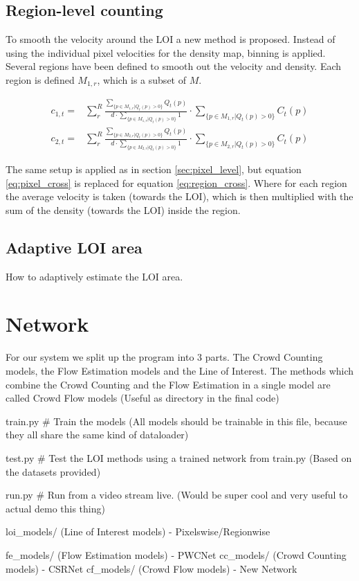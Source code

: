 \subsection{Region-level counting}
To smooth the velocity around the LOI a new method is proposed. Instead of using the individual pixel velocities for the density map, binning is applied. Several regions have been defined to smooth out the velocity and density. Each region is defined $M_{1,r}$, which is a subset of $M$.

\begin{equation}
	\begin{aligned}
		c_{1,t} =& \sum^R_{r} \frac{\sum_{\{p \in M_{1,r} | Q_t(p) > 0\}} Q_t(p)}
		{d \cdot \sum_{\{p \in M_{1,r} | Q_t(p) > 0\}} 1} \cdot \sum_{\{p \in M_{1,r} | Q_t(p) > 0\}} C_t(p)\\
		c_{2,t} =& \sum^R_{r} \frac{\sum_{\{p \in M_{2,r} | Q_t(p) > 0\}} Q_t(p)}
		{d \cdot \sum_{\{p \in M_{2,r} | Q_t(p) > 0\}} 1} \cdot \sum_{\{p \in M_{2,r} | Q_t(p) > 0\}} C_t(p)
	\end{aligned}
	\label{eq:region_cross}
\end{equation}

The same setup is applied as in section \ref{sec:pixel_level}, but equation \ref{eq:pixel_cross} is replaced for equation \ref{eq:region_cross}. Where for each region the average velocity is taken (towards the LOI), which is then multiplied with the sum of the density (towards the LOI) inside the region.


\subsection{Adaptive LOI area}
How to adaptively estimate the LOI area.


\section{Network}


For our system we split up the program into 3 parts. The Crowd Counting models, the Flow Estimation models and the Line of Interest. The methods which combine the Crowd Counting and the Flow Estimation in a single model are called Crowd Flow models (Useful as directory in the final code)

train.py \# Train the models (All models should be trainable in this file, because they all share the same kind of dataloader)

test.py \# Test the LOI methods using a trained network from train.py (Based on the datasets provided)

run.py \# Run from a video stream live. (Would be super cool and very useful to actual demo this thing)

loi\_models/ (Line of Interest models) - Pixelswise/Regionwise

fe\_models/ (Flow Estimation models) - PWCNet
cc\_models/ (Crowd Counting models) - CSRNet
cf\_models/ (Crowd Flow models) - New Network

